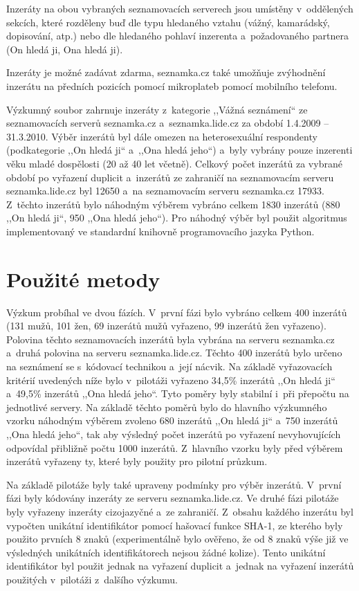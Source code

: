 \documentclass[a4paper, 12pt, notitlepage, oneside, numbers=noenddot]{report}
\begin{document}
Inzeráty na obou vybraných seznamovacích serverech jsou umístěny
v~oddělených sekcích, které rozděleny buď dle typu hledaného vztahu
(vážný, kamarádský, dopisování, atp.) nebo dle hledaného pohlaví
inzerenta a~požadovaného partnera (On hledá ji, Ona hledá ji).

Inzeráty je možné zadávat zdarma, seznamka.cz také umožňuje zvýhodnění
inzerátu na předních pozicích pomocí mikroplateb pomocí mobilního
telefonu.

Výzkumný soubor zahrnuje inzeráty z~kategorie ,,Vážná seznámení`` ze
seznamovacích serverů seznamka.cz a~seznamka.lide.cz za období
1.4.2009 -- 31.3.2010.  Výběr in\-ze\-rá\-tů byl dále omezen na
heterosexuální respondenty (podkategorie ,,On hledá ji`` a~,,Ona hledá
jeho``) a~byly vybrány pouze inzerenti věku mladé dospělosti (20 až 40
let včetně).  Celkový počet inzerátů za vybrané období po vyřazení
duplicit a~inzerátů ze zahraničí na seznamovacím serveru
seznamka.lide.cz byl 12650 a~na seznamovacím serveru seznamka.cz
17933.  Z~těchto inzerátů bylo náhodným výběrem vybráno celkem 1830
inzerátů (880 ,,On hledá ji``, 950 ,,Ona hledá jeho``).  Pro náhodný
výběr byl použit algoritmus \citet{WichmannHill1982} implementovaný ve
standardní knihovně programovacího jazyka Python.

\section{Použité metody}
Výzkum probíhal ve dvou fázích. V~první fázi bylo vybráno celkem 400
inzerátů (131 mužů, 101 žen, 69 inzerátů mužů vyřazeno, 99 inzerátů
žen vyřazeno).  Polovina těchto seznamovacích inzerátů byla vybrána na
serveru seznamka.cz a~druhá polovina na serveru seznamka.lide.cz.
Těchto 400 inzerátů bylo určeno na seznámení se s~kódovací technikou
a~její nácvik.  Na základě vyřazovacích kritérií uvedených níže bylo
v~pilotáži vyřazeno 34,5\% inzerátů ,,On hledá ji`` a~49,5\% inzerátů
,,Ona hledá jeho``. Tyto poměry byly stabilní i~při přepočtu na
jednotlivé servery. Na základě těchto poměrů bylo do hlavního
výzkumného vzorku náhodným výběrem zvoleno 680 inzerátů ,,On hledá
ji`` a~750 inzerátů ,,Ona hledá jeho``, tak aby výsledný počet
inzerátů po vyřazení nevyhovujících odpovídal přibližně počtu 1000
inzerátů. Z~hlavního vzorku byly před výběrem inzerátů vyřazeny ty,
které byly použity pro pilotní průzkum.

Na základě pilotáže byly také upraveny podmínky pro výběr
inzerátů. V~první fázi byly kódovány inzeráty ze serveru
seznamka.lide.cz. Ve druhé fázi pilotáže byly vyřazeny inzeráty
cizojazyčné a~ze zahraničí. Z~obsahu každého inzerátu byl vypočten
unikátní identifikátor pomocí hašovací funkce SHA-1, ze kterého byly
použito prvních 8 znaků (ex\-pe\-ri\-mentálně bylo ověřeno, že od 8 znaků
výše již ve výsledných unikátních identifikátorech nejsou žádné
kolize). Tento unikátní identifikátor byl použit jednak na vyřazení
duplicit a~jednak na vyřazení inzerátů použitých v~pilotáži z~dalšího
výzkumu.
\end{document}
